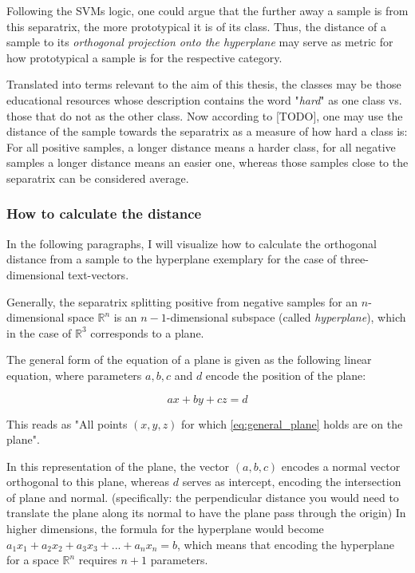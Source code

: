 \documentclass[11pt,
  paper=a4, 
  hidelinks,
  bibliography=totocnumbered,
	captions=tableheading,
	BCOR=10mm
]{scrreprt}
\theoremstyle{definition}
\begin{document}
Following the SVMs logic, one could argue that the further away a sample is from this separatrix, the more prototypical it is of its class. Thus, the distance of a sample to its \textit{orthogonal projection onto the hyperplane} %
may serve as metric for how prototypical a sample is for the respective category. 

Translated into terms relevant to the aim of this thesis, the classes may be those educational resources whose description contains the word "\textit{hard}" as one class vs. those that do not as the other class. Now according to [TODO], one may use the distance of the sample towards the separatrix as a measure of how hard a class is: For all positive samples, a longer distance means a harder class, for all negative samples a longer distance means an easier one, whereas those samples close to the separatrix can be considered average.

\subsubsection*{How to calculate the distance}

\noindent In the following paragraphs, I will visualize how to calculate the orthogonal distance from a sample to the hyperplane exemplary for the case of three-dimensional text-vectors.

Generally, the separatrix splitting positive from negative samples for an $n$-dimensional space $\mathds{R}^n$ is an $n-1$-dimensional subspace (called \textit{hyperplane}), which in the case of $\mathds{R}^3$ corresponds to a plane. 

The general form of the equation of a plane is given as the following linear equation, where parameters $a, b, c$ and $d$ encode the position of the plane:

\begin{equation}
	\label{eq:general_plane}
	ax + by + cz = d
\end{equation}

This reads as "All points $(x,y,z)$ for which \ref{eq:general_plane} holds are on the plane". 

In this representation of the plane, the vector $(a,b,c)$ encodes a normal vector orthogonal to this plane, whereas $d$ serves as intercept, encoding the intersection of plane and normal. (specifically: the perpendicular distance you would need to translate the plane along its normal to have the plane pass through the origin) In higher dimensions, the formula for the hyperplane would become $a_1x_1+a_2x_2+a_3x_3+...+a_nx_n = b$, which means that encoding the hyperplane for a space $\mathds{R}^n$ requires $n+1$ parameters.
\end{document}
